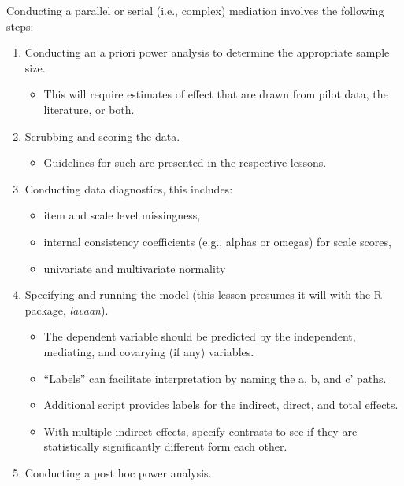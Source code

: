 \documentclass[
  11pt,
]{book}
\providecommand{\tightlist}{%
  \setlength{\itemsep}{0pt}\setlength{\parskip}{0pt}}
\begin{document}
Conducting a parallel or serial (i.e., complex) mediation involves the following steps:

\begin{enumerate}
\def\labelenumi{\arabic{enumi}.}
\tightlist
\item
  Conducting an a priori power analysis to determine the appropriate sample size.

  \begin{itemize}
  \tightlist
  \item
    This will require estimates of effect that are drawn from pilot data, the literature, or both.
  \end{itemize}
\item
  \href{https://lhbikos.github.io/ReC_MultivModel/scrub.html}{Scrubbing} and \href{https://lhbikos.github.io/ReC_MultivModel/score.html}{scoring} the data.

  \begin{itemize}
  \tightlist
  \item
    Guidelines for such are presented in the respective lessons.
  \end{itemize}
\item
  Conducting data diagnostics, this includes:

  \begin{itemize}
  \tightlist
  \item
    item and scale level missingness,
  \item
    internal consistency coefficients (e.g., alphas or omegas) for scale scores,
  \item
    univariate and multivariate normality
  \end{itemize}
\item
  Specifying and running the model (this lesson presumes it will with the R package, \emph{lavaan}).

  \begin{itemize}
  \tightlist
  \item
    The dependent variable should be predicted by the independent, mediating, and covarying (if any) variables.
  \item
    ``Labels'' can facilitate interpretation by naming the a, b, and c' paths.
  \item
    Additional script provides labels for the indirect, direct, and total effects.
  \item
    With multiple indirect effects, specify contrasts to see if they are statistically significantly different form each other.
  \end{itemize}
\item
  Conducting a post hoc power analysis.


\end{enumerate}
\end{document}

